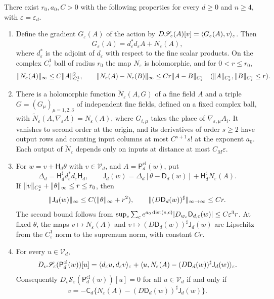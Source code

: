 \begin{lemma}\label{ch07:lem:wilson-euler}
There exist $r_0,a_0,C>0$ with the following properties for every $d\ge0$ and $n\ge4$, with $\varepsilon=\varepsilon_d$.
\begin{enumerate}
\item Define the gradient $G_\varepsilon(A)$ of the action by $D\mathscr S_\varepsilon(A)[v]=\langle G_\varepsilon(A),v\rangle_\varepsilon$. Then
\[
 G_\varepsilon(A)=d_\varepsilon^*d_\varepsilon A+N_\varepsilon(A),
\]
where $d_\varepsilon^*$ is the adjoint of $d_\varepsilon$ with respect to the fine scalar products. On the complex $C^1_\varepsilon$ ball of radius $r_0$ the map $N_\varepsilon$ is holomorphic, and for $0<r\le r_0$,
\[
 \lVert N_\varepsilon(A)\rVert_\infty\le C\lVert A\rVert_{C^1_\varepsilon}^2,\qquad
 \lVert N_\varepsilon(A)-N_\varepsilon(B)\rVert_\infty\le Cr\lVert A-B\rVert_{C^1_\varepsilon}
 \quad(\lVert A\rVert_{C^1_\varepsilon},\lVert B\rVert_{C^1_\varepsilon}\le r).
\]
\item There is a holomorphic function $\widetilde N_\varepsilon(A,G)$ of a fine field $A$ and a triple $G=(G_\mu)_{\mu=1,2,3}$ of independent fine fields, defined on a fixed complex ball, with $\widetilde N_\varepsilon(A,\nabla_\varepsilon A)=N_\varepsilon(A)$, where $G_{i,\mu}$ takes the place of $\nabla_{\varepsilon,\mu}A_i$. It vanishes to second order at the origin, and its derivatives of order $s\ge2$ have output rows and counting input columns at most $C^{s+1}s!$ at the exponent $a_0$. Each output of $\widetilde N_\varepsilon$ depends only on inputs at distance at most $C_M\varepsilon$.
\item For $w=v+\mathsf H_d\theta$ with $v\in\mathcal V_d$, and $A=\mathsf P_d^{\mathrm{cl}}(w)$, put
\[
 \Delta_d=\mathsf H_d^\sharp d_\varepsilon^*d_\varepsilon\mathsf H_d,\qquad
 \mathsf J_d(w)=\Delta_d[\theta-\mathsf D_d(w)]+\mathsf H_d^\sharp N_\varepsilon(A).
\]
If $\lVert v\rVert_{C^1_\varepsilon}+\lVert \theta\rVert_\infty\le r\le r_0$, then
\[
 \lVert \mathsf J_d(w)\rVert_\infty\le C(\lVert \theta\rVert_\infty+r^2),\qquad
 \lVert (D\mathsf D_d(w))^\sharp\rVert_{\infty\to\infty}\le Cr .
\]
The second bound follows from $\sup_e\sum_ce^{a_0\operatorname{dist}(e,c)}\lvert D_{w_e}\mathsf D_{d,c}(w)\rvert\le C\varepsilon^3r$. At fixed $\theta$, the maps $v\mapsto N_\varepsilon(A)$ and $v\mapsto(D\mathsf D_d(w))^\sharp\mathsf J_d(w)$ are Lipschitz from the $C^1_\varepsilon$ norm to the supremum norm, with constant $Cr$.
\item For every $u\in\mathcal V_d$,
\[
 D_v\mathscr S_\varepsilon(\mathsf P_d^{\mathrm{cl}}(w))[u]
 =\langle d_\varepsilon u,d_\varepsilon v\rangle_\varepsilon
 +\langle u,N_\varepsilon(A)-(D\mathsf D_d(w))^\sharp\mathsf J_d(w)\rangle_\varepsilon .
\]
Consequently $D_v\mathscr S_\varepsilon(\mathsf P_d^{\mathrm{cl}}(w))[u]=0$ for all $u\in\mathcal V_d$ if and only if
\[
 v=-\mathsf C_d\bigl\{N_\varepsilon(A)-(D\mathsf D_d(w))^\sharp\mathsf J_d(w)\bigr\}.
\]
\end{enumerate}
\end{lemma}

